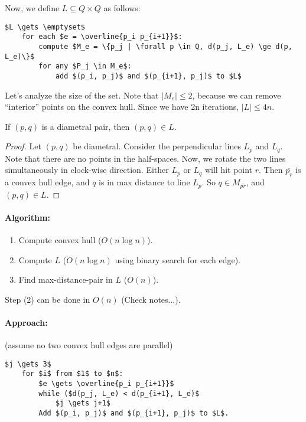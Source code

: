 Now, we define $L \subseteq Q \times Q$ as follows:

\begin{lstlisting}[mathescape]
	$L \gets \emptyset$
	for each $e = \overline{p_i p_{i+1}}$:
		compute $M_e = \{p_j | \forall p \in Q, d(p_j, L_e) \ge d(p, L_e)\}$
		for any $P_j \in M_e$:
			add $(p_i, p_j)$ and $(p_{i+1}, p_j)$ to $L$
\end{lstlisting}

Let's analyze the size of the set. Note that $|M_e| \le 2$, because we can remove ``interior'' points on the convex hull. Since we have 2n iterations, $|L| \le 4n$.

\begin{mylemma}
	If $(p,q)$ is a diametral pair, then $(p,q) \in L$.
\end{mylemma}
\begin{proof}
	Let $(p,q)$ be diametral. Consider the perpendicular lines $L_p$ and $L_q$. Note that there are no points in the half-spaces. Now, we rotate the two lines simultaneously in clock-wise direction. Either $L_p$ or $L_q$ will hit point $r$. Then $\overline{p_r}$ is a convex hull edge, and $q$ is in max distance to line $L_p$. So $q \in M_{\overline{pr}}$, and $(p,q)\in L$.
\end{proof}

\paragraph{Algorithm:}
\begin{enumerate}
	\item Compute convex hull ($O(n \log n)$).
	\item Compute $L$ ($O(n \log n)$ using binary search for each edge).
	\item Find max-distance-pair in $L$ ($O(n)$).
\end{enumerate}


Step (2) can be done in $O(n)$ (Check notes...).


\paragraph{Approach:} (assume no two convex hull edges are parallel)

\begin{lstlisting}[mathescape]
	$j \gets 3$
	for $i$ from $1$ to $n$:
		$e \gets \overline{p_i p_{i+1}}$
		while ($d(p_j, L_e) < d(p_{i+1}, L_e)$
			$j \gets j+1$
		Add $(p_i, p_j)$ and $(p_{i+1}, p_j)$ to $L$.
\end{lstlisting}

